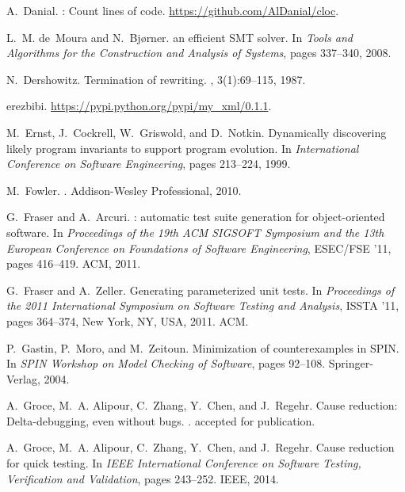 \documentclass[sigconf]{acmart}
\begin{document}
\begin{thebibliography}{10}
A.~Danial.
: Count lines of code.
\newblock \url{https://github.com/AlDanial/cloc}.

L.~M. de~Moura and N.~Bj{\o}rner.
 an efficient {SMT} solver.
\newblock In {\em Tools and Algorithms for the Construction and Analysis of
  Systems}, pages 337--340, 2008.

N.~Dershowitz.
\newblock Termination of rewriting.
, 3(1):69--115, 1987.

erezbibi.
\newblock \url{https://pypi.python.org/pypi/my_xml/0.1.1}.

M.~Ernst, J.~Cockrell, W.~Griswold, and D.~Notkin.
\newblock Dynamically discovering likely program invariants to support program
  evolution.
\newblock In {\em International Conference on Software Engineering}, pages
  213--224, 1999.

M.~Fowler.
.
\newblock Addison-Wesley Professional, 2010.

G.~Fraser and A.~Arcuri.
: automatic test suite generation for object-oriented
  software.
\newblock In {\em Proceedings of the 19th ACM SIGSOFT Symposium and the 13th
  European Conference on Foundations of Software Engineering}, ESEC/FSE '11,
  pages 416--419. ACM, 2011.

G.~Fraser and A.~Zeller.
\newblock Generating parameterized unit tests.
\newblock In {\em Proceedings of the 2011 International Symposium on Software
  Testing and Analysis}, ISSTA '11, pages 364--374, New York, NY, USA, 2011.
  ACM.

P.~Gastin, P.~Moro, and M.~Zeitoun.
\newblock Minimization of counterexamples in {SPIN}.
\newblock In {\em SPIN Workshop on Model Checking of Software}, pages 92--108.
  Springer-Verlag, 2004.

A.~Groce, M.~A. Alipour, C.~Zhang, Y.~Chen, and J.~Regehr.
\newblock Cause reduction: Delta-debugging, even without bugs.
.
\newblock accepted for publication.

A.~Groce, M.~A. Alipour, C.~Zhang, Y.~Chen, and J.~Regehr.
\newblock Cause reduction for quick testing.
\newblock In {\em IEEE International Conference on Software Testing,
  Verification and Validation}, pages 243--252. IEEE, 2014.


\end{thebibliography}
\end{document}
